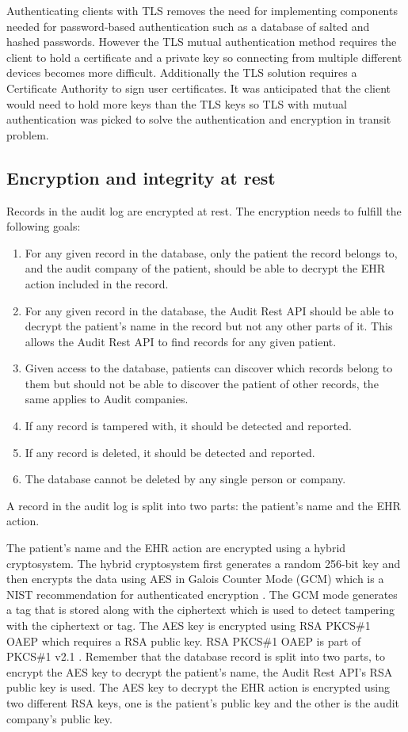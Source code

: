 \documentclass[11pt]{article}
\begin{document}
\begin{flushleft}
Authenticating clients with TLS removes the need for implementing components needed for password-based authentication such as a database of salted and hashed passwords. However the TLS mutual authentication method requires the client to hold a certificate and a private key so connecting from multiple different devices becomes more difficult. Additionally the TLS solution requires a Certificate Authority to sign user certificates. It was anticipated that the client would need to hold more keys than the TLS keys so TLS with mutual authentication was picked to solve the authentication and encryption in transit problem.

\subsection{Encryption and integrity at rest}

Records in the audit log are encrypted at rest. The encryption needs to fulfill the following goals:

\begin{enumerate}
	\item For any given record in the database, only the patient the record belongs to, and the audit company of the patient, should be able to decrypt the EHR action included in the record.
	\item For any given record in the database, the Audit Rest API should be able to decrypt the patient's name in the record but not any other parts of it. This allows the Audit Rest API to find records for any given patient.
	\item Given access to the database, patients can discover which records belong to them but should not be able to discover the patient of other records, the same applies to Audit companies.
	\item If any record is tampered with, it should be detected and reported.
	\item If any record is deleted, it should be detected and reported.
	\item The database cannot be deleted by any single person or company.
\end{enumerate}

A record in the audit log is split into two parts: the patient's name and the EHR action.

The patient's name and the EHR action are encrypted using a hybrid cryptosystem. The hybrid cryptosystem first generates a random 256-bit key and then encrypts the data using AES in Galois Counter Mode (GCM) which is a NIST recommendation for authenticated encryption \cite{nist_gcm}. The GCM mode generates a tag that is stored along with the ciphertext which is used to detect tampering with the ciphertext or tag. The AES key is encrypted using RSA PKCS\#1 OAEP which requires a RSA public key. RSA PKCS\#1 OAEP is part of PKCS\#1 v2.1 \cite{pkcs1}. Remember that the database record is split into two parts, to encrypt the AES key to decrypt the patient's name, the Audit Rest API's RSA public key is used. The AES key to decrypt the EHR action is encrypted using two different RSA keys, one is the patient's public key and the other is the audit company's public key.


\end{flushleft}
\end{document}
